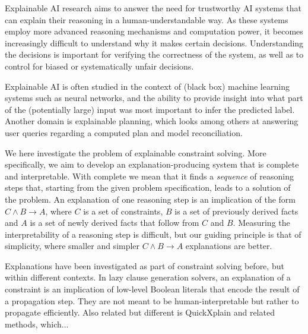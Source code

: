

Explainable AI research aims to answer the need for trustworthy AI systems that can explain their reasoning in a human-understandable way. As these systems employ more advanced reasoning mechanisms and computation power, it becomes increasingly difficult to understand why it makes certain decisions. Understanding the decisions is important for verifying the correctness of the system, as well as to control for biased or systematically unfair decisions.

Explainable AI is often studied in the context of (black box) machine learning systems such as neural networks, and the ability to provide insight into what part of the (potentially large) input was most important to infer the predicted label. Another domain is explainable planning, which looks among others at answering user queries regarding a computed plan and model reconciliation.

We here investigate the problem of explainable constraint solving. More specifically, we aim to develop an explanation-producing system that is complete and interpretable. With complete we mean that it finds a \textit{sequence} of reasoning steps that, starting from the given problem specification, leads to a solution of the problem. An explanation of one reasoning step is an implication of the form $C \wedge B \rightarrow A$, where $C$ is a set of constraints, $B$ is a set of previously derived facts and $A$ is a set of newly derived facts that follow from $C$ and $B$. Measuring the interpretability of a reasoning step is difficult, but our guiding principle is that of simplicity, where smaller and simpler $C \wedge B \rightarrow A$ explanations are better.

Explanations have been investigated as part of constraint solving before, but within different contexts. In lazy clause generation solvers, an explanation of a constraint is an implication of low-level Boolean literals that encode the result of a propagation step. They are not meant to be human-interpretable but rather to propagate efficiently. Also related but different is QuickXplain and related methods, which...

